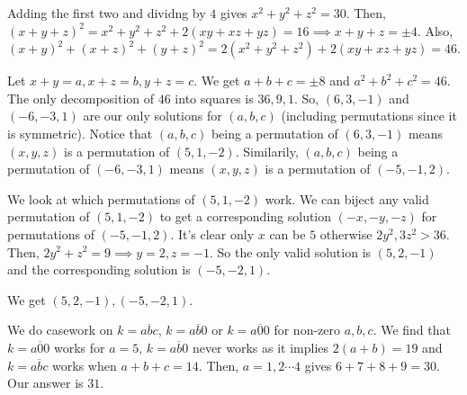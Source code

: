 \documentclass[11pt]{article}
\begin{document}
\begin{sol} 
Adding the first two and dividng by $4$ gives $x^2+y^2+z^2=30$. Then, $(x+y+z)^2=x^2+y^2+z^2+2(xy+xz+yz)=16\implies x+y+z=\pm 4$. Also, $(x+y)^2+(x+z)^2+(y+z)^2=2(x^2+y^2+z^2)+2(xy+xz+yz)=46$. 

Let $x+y=a, x+z=b, y+z=c$. We get $a+b+c=\pm 8$ and $a^2+b^2+c^2=46$. The only decomposition of $46$ into squares is $36,9,1$. So, $(6,3,-1)$ and $(-6,-3,1)$ are our only solutions for $(a,b,c)$ (including permutations since it is symmetric). Notice that $(a,b,c)$ being a permutation of $(6,3,-1)$ means $(x,y,z)$ is a permutation of $(5,1,-2)$. Similarily, $(a,b,c)$ being a permutation of $(-6,-3,1)$ means $(x,y,z)$ is a permutation of $(-5,-1,2)$.

We look at which permutations of $(5,1,-2)$ work. We can biject any valid permutation of $(5,1,-2)$ to get a corresponding solution $(-x,-y,-z)$ for permutations of $(-5,-1,2)$. It's clear only $x$ can be $5$ otherwise $2y^2,3z^2>36$. Then, $2y^2+z^2=9\implies y=2,z=-1$. So the only valid solution is $(5,2,-1)$ and the corresponding solution is $(-5,-2,1)$.

We get $\boxed{(5,2,-1),(-5,-2,1)}$.
\end{sol}


\begin{sol}
We do casework on $k=\overline{abc}$, $k=\overline{ab0}$ or $k=\overline{a00}$ for non-zero $a,b,c$. We find that $k=\overline{a00}$ works for $a=5$, $k=\overline{ab0}$ never works as it implies $2(a+b)=19$ and $k=\overline{abc}$ works when $a+b+c=14$. Then, $a=1,2\cdots 4$ gives $6+7+8+9= 30$. Our answer is $\boxed{31}$.
\end{sol}


\end{document}

